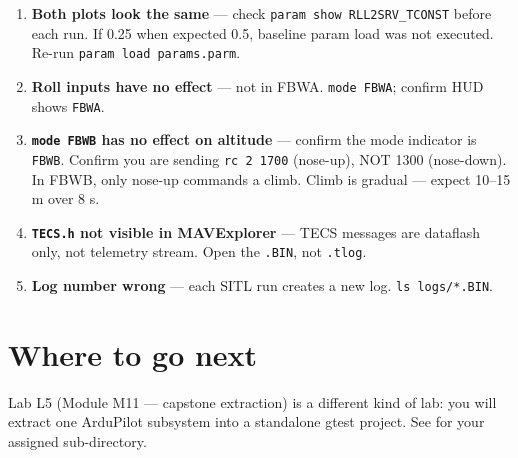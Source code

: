 \documentclass[a4paper,11pt,twoside]{article}
\begin{document}
\begin{enumerate}
  \item \textbf{Both plots look the same} --- check \texttt{param show RLL2SRV\_TCONST} before each run. If 0.25 when expected 0.5, baseline param load was not executed. Re-run \texttt{param load params.parm}.
  \item \textbf{Roll inputs have no effect} --- not in FBWA. \texttt{mode FBWA}; confirm HUD shows \texttt{FBWA}.
  \item \textbf{\texttt{mode FBWB} has no effect on altitude} --- confirm the mode indicator is \texttt{FBWB}. Confirm you are sending \texttt{rc 2 1700} (nose-up), NOT 1300 (nose-down). In FBWB, only nose-up commands a climb. Climb is gradual --- expect 10--15 m over 8 s.
  \item \textbf{\texttt{TECS.h} not visible in MAVExplorer} --- TECS messages are dataflash only, not telemetry stream. Open the \texttt{.BIN}, not \texttt{.tlog}.
  \item \textbf{Log number wrong} --- each SITL run creates a new log. \texttt{ls logs/*.BIN}.
\end{enumerate}

\section*{Where to go next}

Lab L5 (Module M11 --- capstone extraction) is a different kind of lab: you will extract one ArduPilot subsystem into a standalone gtest project. See  for your assigned sub-directory.

\fi
\end{document}

